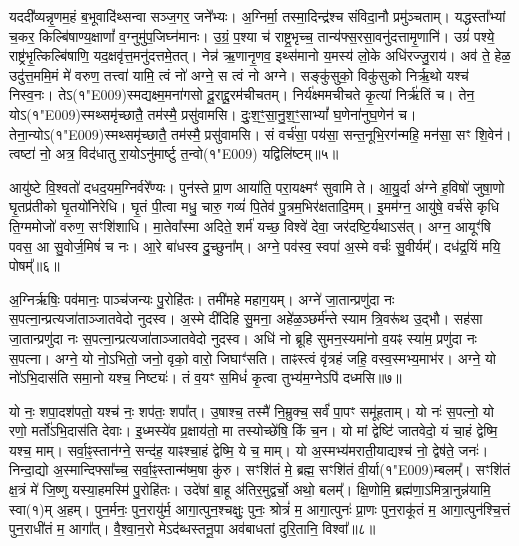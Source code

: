 यददी᳚व्यन्नृ॒णम॒हं ब॒भूवादि॑थ्सन्वा सञ्ज॒गर॒ जने᳚भ्यः। 
अ॒ग्निर्मा॒ तस्मा॒दिन्द्र॑श्च संविदा॒नौ प्रमु॑ञ्चताम्। 
यद्धस्ता᳚भ्यां च॒कर॒ किल्बि॑षाण्य॒क्षाणां᳚ व॒ग्नुमु॑प॒जिघ्न॑मानः। 
उ॒ग्रं॒ प॒श्या च॑ राष्ट्र॒भृच्च॒ तान्य॑फ्स॒रसा॒वनु॑दत्तामृ॒णानि॑। 
उग्रं॑ पश्ये॒ राष्ट्र॑भृ॒त्किल्बि॑षाणि॒ यद॒क्षवृ॑त्त॒मनु॑दत्तमे॒तत्। 
नेन्न॑ ऋ॒णानृ॒णव॒ इथ्स॑मानो य॒मस्य॑ लो॒के अधि॑रज्जु॒राय॑। 
अव॑ ते॒ हेळ॒ उदु॑त्त॒ममि॒मं मे॑ वरुण॒ तत्त्वा॑ यामि॒ त्वं नो॑ अग्ने॒ स त्वं नो अग्ने। 
सङ्कु॑सुको॒ विकु॑सुको निर्\mbox{}ऋ॒थो यश्च॑ निस्व॒नः। 
तेऽ(१\char"E009)स्मद्यक्ष्म॒मना॑गसो दू॒राद्दू॒रम॑चीचतम्। 
निर्य॑क्ष्ममचीचते कृ॒त्यां निर्\mbox{}ऋ॑तिं च। 
तेन॒ योऽ(१\char"E009)स्मथ्समृ॑च्छातै॒ तम॑स्मै॒ प्रसु॑वामसि। 
दुः॒श॒ꣳ॒सा॒नु॒श॒ꣳ॒साभ्यां᳚ घ॒णेना॑नुघ॒णेन॑ च। 
तेना॒न्योऽ(१\char"E009)स्मथ्समृ॑च्छातै॒ तम॑स्मै॒ प्रसु॑वामसि। 
सं वर्च॑सा॒ पय॑सा॒ सन्त॒नूभि॒रग॑न्महि॒ मन॑सा॒ सꣳ शि॒वेन॑। 
त्वष्टा॑ नो॒ अत्र॒ विद॑धातु रा॒योऽनु॑मार्ष्टु त॒न्वो(१\char"E009) यद्विलि॑ष्टम्॥५॥\anuvakamend


आयु॑ष्टे वि॒श्वतो॑ दधद॒यम॒ग्निर्वरे᳚ण्यः। 
पुन॑स्ते प्रा॒ण आया॑ति॒ परा॒यक्ष्मꣳ॑ सुवामि ते। 
आ॒यु॒र्दा अ॑ग्ने ह॒विषो॑ जुषा॒णो घृ॒तप्र॑तीको घृ॒तयो॑निरेधि। 
घृ॒तं पी॒त्वा मधु॒ चारु॒ गव्यं॑ पि॒तेव॑ पु॒त्रम॒भिर॑क्षतादि॒मम्। 
इ॒मम॑ग्न॒ आयु॑षे॒ वर्च॑से कृधि ति॒ग्ममोजो॑ वरुण॒ सꣳशि॑शाधि। 
मा॒तेवा᳚स्मा अदिते॒ शर्म॑ यच्छ॒ विश्वे॑ देवा॒ जर॑दष्टि॒र्यथाऽस॑त्। 
अग्न॒ आयूꣳ॑षि पवस॒ आ सु॒वोर्ज॒मिषं॑ च नः। 
आ॒रे बा॑धस्व दु॒च्छुना᳚म्। 
अग्ने॒ पव॑स्व॒ स्वपा॑ अ॒स्मे वर्चः॑ सु॒वीर्यम्᳚। 
दध॑द्र॒यिं मयि॒ पोषम्᳚॥६॥

अ॒ग्निर्\mbox{}ऋषिः॒ पव॑मानः॒ पाञ्च॑जन्यः पु॒रोहि॑तः। 
तमी॑महे महाग॒यम्। 
अग्ने॑ जा॒तान्प्रणु॑दा नः स॒पत्ना॒न्प्रत्यजा॑ताञ्जातवेदो नुदस्व। 
अ॒स्मे दी॑दिहि सु॒मना॒ अहे॑ळ॒ञ्छर्म॑न्ते स्याम त्रि॒वरू॑थ उ॒द्भौ। 
सह॑सा जा॒तान्प्रणु॑दा नः स॒पत्ना॒न्प्रत्यजा॑ताञ्जातवेदो नुदस्व। 
अधि॑ नो ब्रूहि सुमन॒स्यमा॑नो व॒यꣴ स्या॑म॒ प्रणु॑दा नः स॒पत्ना\sn{}। 
अग्ने॒ यो नो॒ऽभितो॒ जनो॒ वृको॒ वारो॒ जिघाꣳ॑सति। 
ताꣴस्त्वं वृ॑त्रहं जहि॒ वस्व॒स्मभ्य॒माभ॑र। 
अग्ने॒ यो नो॑ऽभि॒दास॑ति समा॒नो यश्च॒ निष्ट्यः॑। 
तं व॒यꣳ स॒मिधं॑ कृ॒त्वा तुभ्य॑म॒ग्नेऽपि॑ दध्मसि॥७॥

यो नः॒ शपा॒दश॑पतो॒ यश्च॑ नः॒ शप॑तः॒ शपा᳚त्। 
उ॒षाश्च॒ तस्मै॑ नि॒म्रुक्च॒ सर्वं॑ पा॒पꣳ समू॑हताम्। 
यो नः॑ स॒पत्नो॒ यो रणो॒ मर्तो॑ऽभि॒दास॑ति देवाः। 
इ॒ध्मस्ये॑व प्र॒क्षाय॑तो॒ मा तस्योच्छे॑षि॒ किं च॒न। 
यो मां द्वेष्टि॑ जातवेदो॒ यं चा॒हं द्वेष्मि॒ यश्च॒ माम्। 
सर्वा॒ꣴ॒स्तान॑ग्ने॒ सन्द॑ह॒ याꣴश्चा॒हं द्वेष्मि॒ ये च॒ माम्। 
यो अ॒स्मभ्य॑मराती॒याद्यश्च॑ नो॒ द्वेष॑ते॒ जनः॑। 
निन्दा॒द्यो अ॒स्मान्दिफ्सा᳚च्च॒ सर्वा॒ꣴ॒स्तान्म॑ष्म॒षा कु॑रु। 
सꣳशि॑तं मे॒ ब्रह्म॒ सꣳशि॑तं वी॒र्या(१\char"E009)म्बलम्᳚। 
सꣳशि॑तं क्ष॒त्रं मे॑ जि॒ष्णु यस्या॒हमस्मि॑ पु॒रोहि॑तः। 
उदे॑षां बा॒हू अ॑तिर॒मुद्वर्चो॒ अथो॒ बलम्᳚। 
क्षि॒णोमि॒ ब्रह्म॑णा॒ऽमित्रा॒नुन्न॑यामि॒ स्वा(१)म् अ॒हम्। 
पुन॒र्मनः॒ पुन॒रायु॑र्म॒ आगा॒त्पुन॒श्चक्षुः॒ पुनः॒ श्रोत्रं॑ म॒ आगा॒त्पुनः॑ प्रा॒णः पुन॒राकू॑तं म॒ आगा॒त्पुन॑श्चि॒त्तं पुन॒राधी॑तं म॒ आगा᳚त्। 
वै॒श्वा॒न॒रो मेऽद॑ब्धस्तनू॒पा अव॑बाधतां दुरि॒तानि॒ विश्वा᳚॥८॥\anuvakamend

